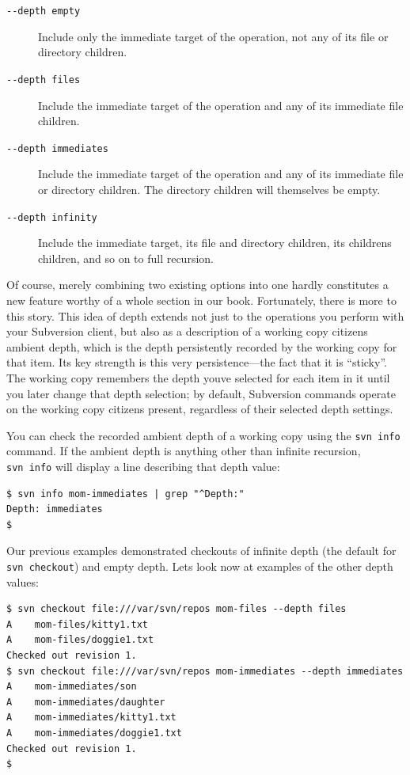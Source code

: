 \begin{description}
\item[\texttt{-\/-depth\ empty}]
Include only the immediate target of the operation, not any of its file
or directory children.
\item[\texttt{-\/-depth\ files}]
Include the immediate target of the operation and any of its immediate
file children.
\item[\texttt{-\/-depth\ immediates}]
Include the immediate target of the operation and any of its immediate
file or directory children. The directory children will themselves be
empty.
\item[\texttt{-\/-depth\ infinity}]
Include the immediate target, its file and directory children, its
children\textquotesingle s children, and so on to full recursion.
\end{description}

Of course, merely combining two existing options into one hardly
constitutes a new feature worthy of a whole section in our book.
Fortunately, there is more to this story. This idea of depth extends not
just to the operations you perform with your Subversion client, but also
as a description of a working copy citizen\textquotesingle s ambient
depth, which is the depth persistently recorded by the working copy for
that item. Its key strength is this very persistence---the fact that it
is ``sticky''. The working copy remembers the depth
you\textquotesingle ve selected for each item in it until you later
change that depth selection; by default, Subversion commands operate on
the working copy citizens present, regardless of their selected depth
settings.

You can check the recorded ambient depth of a working copy using the
\texttt{svn\ info} command. If the ambient depth is anything other than
infinite recursion, \texttt{svn\ info} will display a line describing
that depth value:

\begin{verbatim}
$ svn info mom-immediates | grep "^Depth:"
Depth: immediates
$
\end{verbatim}

Our previous examples demonstrated checkouts of infinite depth (the
default for \texttt{svn\ checkout}) and empty depth.
Let\textquotesingle s look now at examples of the other depth values:

\begin{verbatim}
$ svn checkout file:///var/svn/repos mom-files --depth files
A    mom-files/kitty1.txt
A    mom-files/doggie1.txt
Checked out revision 1.
$ svn checkout file:///var/svn/repos mom-immediates --depth immediates
A    mom-immediates/son
A    mom-immediates/daughter
A    mom-immediates/kitty1.txt
A    mom-immediates/doggie1.txt
Checked out revision 1.
$
\end{verbatim}

